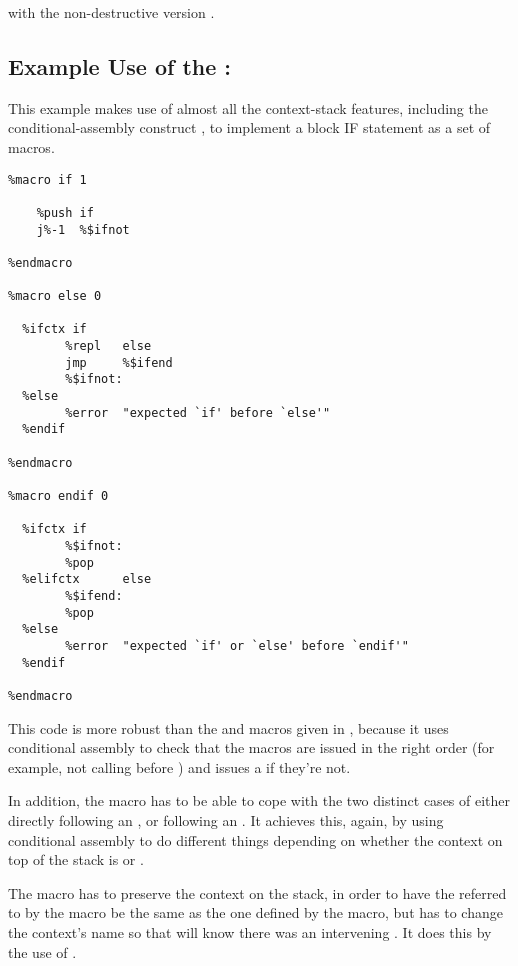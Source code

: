 with the non-destructive version .

\subsection{Example Use of the : }
\label{subsec:blockif}

This example makes use of almost all the context-stack features,
including the conditional-assembly construct , to
implement a block IF statement as a set of macros.

\begin{lstlisting}
%macro if 1

    %push if
    j%-1  %$ifnot

%endmacro

%macro else 0

  %ifctx if
        %repl   else
        jmp     %$ifend
        %$ifnot:
  %else
        %error  "expected `if' before `else'"
  %endif

%endmacro

%macro endif 0

  %ifctx if
        %$ifnot:
        %pop
  %elifctx      else
        %$ifend:
        %pop
  %else
        %error  "expected `if' or `else' before `endif'"
  %endif

%endmacro
\end{lstlisting}

This code is more robust than the  and  macros
given in , because it uses conditional assembly to check
that the macros are issued in the right order (for example, not calling 
before ) and issues a  if they're not.

In addition, the  macro has to be able to cope with the two
distinct cases of either directly following an , or following
an . It achieves this, again, by using conditional assembly
to do different things depending on whether the context on top of
the stack is  or .

The  macro has to preserve the context on the stack, in
order to have the  referred to by the  macro be the
same as the one defined by the  macro, but has to change
the context's name so that  will know there was an
intervening . It does this by the use of .

